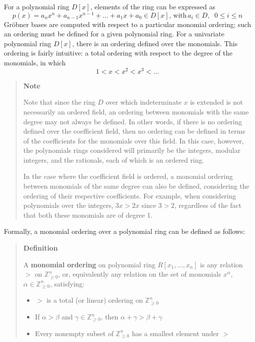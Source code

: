 \documentclass[letterpaper,12pt,titlepage,oneside,final]{book}
\newenvironment{defn}{\begin{quote}%
  \textbf{Definition }%
  \quad
}{%
\end{quote}%
}
\newenvironment{note}{\begin{quote}%
  \textbf{Note }%
  \quad
}{%
\end{quote}%
}
\begin{document}
For a polynomial ring ${D[x]}$, elements of the ring can be expressed as
\begin{equation*}
  p(x) = a_n x^n + a_{n-1} x^{n-1} + \ldots + a_1 x + a_0 \in D[x],\, \textrm{with}\, a_i \in D,\;\; 0 \leq i \leq n
\end{equation*}
Gr\"obner bases are computed with respect to a particular monomial ordering; such an ordering must be defined for a given polynomial ring.  For a univariate polynomial ring ${D[x]}$, there is an ordering defined over the monomials.  This ordering is fairly intuitive: a total ordering with respect to the degree of the monomials, in which
\begin{equation*}
  1 < x < x^2 < x^3 < \ldots
\end{equation*}
\begin{note}
  Note that since the ring ${D}$ over which indeterminate ${x}$ is extended is not necessarily an ordered field, an ordering between monomials with the same degree may not always be defined.  In other words, if there is no ordering defined over the coefficient field, then no ordering can be defined in terms of the coefficients for the monomials over this field.  In this case, however, the polynomials rings considered will primarily be the integers, modular integers, and the rationals, each of which is an ordered ring.  

  In the case where the coefficient field is ordered, a monomial ordering between monomials of the same degree can also be defined, considering the ordering of their respective coefficients.  For example, when considering polynomials over the integers, ${3x > 2x}$ since ${3 > 2}$, regardless of the fact that both these monomials are of degree 1.
\end{note}

Formally, a monomial ordering over a polynomial ring can be defined as follows: 

\begin{defn}
  A \textbf{monomial ordering} on polynomial ring $R[x_1, \ldots, x_n]$ is any relation $>$ on $\mathbb{Z}^n_{\geq 0}$, or, equivalently any relation on the set of monomials $x^\alpha$, $\alpha \in \mathbb{Z}^n_{\geq 0}$, satisfying:
  \begin{itemize}
    \item $>$ is a total (or linear) ordering on $\mathbb{Z}^n_{\geq 0}$
    \item If $\alpha > \beta$ and $\gamma \in \mathbb{Z}^n_{\geq 0}$, then $\alpha + \gamma > \beta + \gamma$
    \item Every nonempty subset of $\mathbb{Z}^n_{\geq 0}$ has a smallest element under $>$ \hfill \cite{Cox} 
  \end{itemize}
\end{defn}
\end{document}
